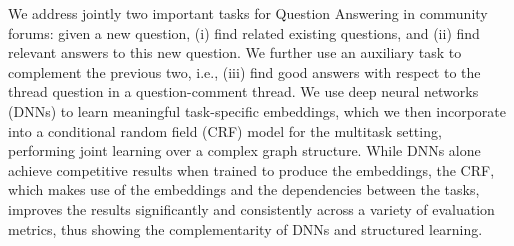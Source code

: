 We address jointly two important tasks for Question Answering in community forums: given a new question, (i) find related existing questions, and (ii) find relevant answers to this new question. We further use an auxiliary task to complement the previous two, i.e., (iii) find good answers with respect to the thread question in a question-comment thread. We use deep neural networks (DNNs) to learn meaningful task-specific embeddings, which we then incorporate into a conditional random field (CRF) model for the multitask setting, performing joint learning over a complex graph structure. While DNNs alone achieve competitive results when trained to produce the embeddings, the CRF, which makes use of the embeddings and the dependencies between the tasks, improves the results significantly and consistently across a variety of evaluation metrics, thus showing the complementarity of DNNs and structured learning.
